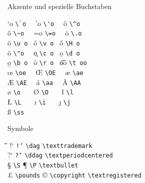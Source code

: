 \begin{table}[tbp]
\caption{Akzente und spezielle Buchstaben} \label{akzente}
\begin{symbols}
\a`o  \>   \verb|\`o  | \> \a'o  \> \verb|\'o  | \> \^o   \>   \verb|\^o  | \\
\~o   \>   \verb|\~o  | \> \a=o  \> \verb|\=o  | \> \.o   \>   \verb|\.o  | \\
\u o  \>   \verb|\u o | \> \v o  \> \verb|\v o | \> \H o  \>   \verb|\H o | \\
\"o   \>   \verb|\"o  | \> \c o  \> \verb|\c o | \> \d o  \>   \verb|\d o | \\
\b o  \>   \verb|\b o | \> \r o  \> \verb|\r o | \> \t oo \>   \verb|\t oo| \\[6pt]
\oe   \>   \verb|\oe  | \> \OE   \> \verb|\OE  | \> \ae   \>   \verb|\ae  | \\
\AE   \>   \verb|\AE  | \> \aa   \> \verb|\aa  | \> \AA   \>   \verb|\AA  | \\
\o    \>   \verb|\o   | \> \O    \> \verb|\O   | \> \l    \>   \verb|\l   | \\
\L    \>   \verb|\L   | \> \i    \> \verb|\i   | \> \j    \>   \verb|\j   | \\
\ss   \>   \verb|\ss  | \\
\end{symbols}
\end{table}
 
\begin{table}[tbp]
  \caption{Symbole} \label{specials}
   \begin{tabbing}
   \hspace{1cm}\=\hspace{3.15cm}\=  \hspace{1cm}\=\hspace{3.15cm}\=
   \hspace{1cm}\=\hspace{3.5cm}\=  \kill
!` \> \texttt{!{}`}      \> \dag \> \verb|\dag|            \> \texttrademark  \> \verb|\texttrademark|   \\         
?` \> \texttt{?{}`}      \> \ddag \> \verb|\ddag|          \> \textperiodcentered \> \verb|\textperiodcentered| \\ 
\S \> \verb|\S|          \> \P \> \verb|\P|                \> \textbullet    \> \verb|\textbullet| \\              
\pounds\> \verb|\pounds| \> \copyright \> \verb|\copyright|\>\textregistered  \> \verb|\textregistered| \\ 
   \end{tabbing}
\end{table}


